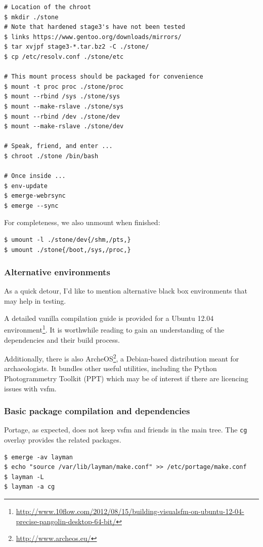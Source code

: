\documentclass{article}
\begin{document}
\begin{lstlisting}
# Location of the chroot
$ mkdir ./stone
# Note that hardened stage3's have not been tested
$ links https://www.gentoo.org/downloads/mirrors/
$ tar xvjpf stage3-*.tar.bz2 -C ./stone/
$ cp /etc/resolv.conf ./stone/etc

# This mount process should be packaged for convenience
$ mount -t proc proc ./stone/proc
$ mount --rbind /sys ./stone/sys
$ mount --make-rslave ./stone/sys
$ mount --rbind /dev ./stone/dev
$ mount --make-rslave ./stone/dev

# Speak, friend, and enter ...
$ chroot ./stone /bin/bash

# Once inside ...
$ env-update
$ emerge-webrsync
$ emerge --sync
\end{lstlisting}

For completeness, we also unmount when finished:

\begin{lstlisting}
$ umount -l ./stone/dev{/shm,/pts,}
$ umount ./stone{/boot,/sys,/proc,}
\end{lstlisting}
\subsubsection{Alternative environments}
As a quick detour, I'd like to mention alternative black box environments that may help in testing.

A detailed vanilla compilation guide is provided for a Ubuntu 12.04 environment\footnote{\url{http://www.10flow.com/2012/08/15/building-visualsfm-on-ubuntu-12-04-precise-pangolin-desktop-64-bit/}}. It is worthwhile reading to gain an understanding of the dependencies and their build process.

Additionally, there is also ArcheOS\footnote{\url{http://www.archeos.eu/}}, a Debian-based distribution meant for archaeologists. It bundles other useful utilities, including the Python Photogrammetry Toolkit (PPT) which may be of interest if there are licencing issues with vsfm.
\subsubsection{Basic package compilation and dependencies}
Portage, as expected, does not keep vsfm and friends in the main tree. The {\tt cg} overlay provides the related packages.

\begin{lstlisting}
$ emerge -av layman
$ echo "source /var/lib/layman/make.conf" >> /etc/portage/make.conf
$ layman -L
$ layman -a cg
\end{lstlisting}
\end{document}
